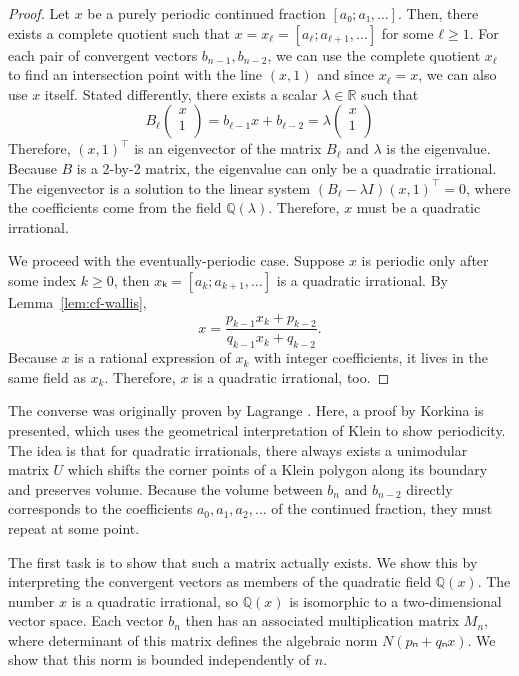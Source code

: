 \begin{proof}
  Let $x$ be a purely periodic continued fraction $[a₀; a₁, …]$.
  Then, there exists a complete quotient such that $x = x_ℓ = [a_ℓ; a_{ℓ+1}, …]$ for some $ℓ ≥ 1$.
  For each pair of convergent vectors $b_{n-1}, b_{n-2}$, we can use the
  complete quotient $x_ℓ$ to find an intersection point with the line $(x, 1)$
  and since $x_ℓ = x$, we can also use $x$ itself.
  Stated differently, there exists a scalar $λ ∈ ℝ$ such that
  \[
    B_ℓ
    \begin{pmatrix}
      x \\
      1 \\
    \end{pmatrix}
    =
    b_{ℓ-1} x + b_{ℓ-2}
    = λ
    \begin{pmatrix}
      x \\
      1 \\
    \end{pmatrix}
  \]
  Therefore, $(x, 1)^⊤$ is an eigenvector of the matrix $B_ℓ$
  and $λ$ is the eigenvalue.
  Because $B$ is a 2-by-2 matrix,
  the eigenvalue can only be a quadratic irrational.
  The eigenvector is a solution to the linear system $(B_ℓ - λ I) (x, 1)^⊤ = 0$,
  where the coefficients come from the field $ℚ(λ)$.
  Therefore, $x$ must be a quadratic irrational.

  We proceed with the eventually-periodic case.
  Suppose $x$ is periodic only after some index $k ≥ 0$,
  then $xₖ = [a_k; a_{k+1}, …]$ is a quadratic irrational.
  By Lemma~\ref{lem:cf-wallis},
  \[
    x = \frac{p_{k-1} x_k + p_{k-2}}{q_{k-1} x_k + q_{k-2}}.
  \]
  Because $x$ is a rational expression of $x_k$ with integer coefficients,
  it lives in the same field as $x_k$.
  Therefore, $x$ is a quadratic irrational, too.
\end{proof}

The converse was originally proven by Lagrange \cite{Lagrange70}.
Here, a proof by Korkina \cite{Korkina96} is presented,
which uses the geometrical interpretation of Klein to show periodicity.
The idea is that for quadratic irrationals,
there always exists a unimodular matrix $U$ which shifts the corner points of a
Klein polygon along its boundary and preserves volume.
Because the volume between $b_n$ and $b_{n-2}$ directly corresponds to
the coefficients $a_0, a_1, a_2, …$ of the continued fraction,
they must repeat at some point.

The first task is to show that such a matrix actually exists.
We show this by interpreting the convergent vectors as members of the
quadratic field $ℚ(x)$.
The number $x$ is a quadratic irrational, so $ℚ(x)$ is isomorphic to a
two-dimensional vector space.
Each vector $b_n$ then has an associated multiplication matrix $M_n$,
where determinant of this matrix defines the algebraic norm $N(pₙ + qₙ x)$.
We show that this norm is bounded independently of $n$.

